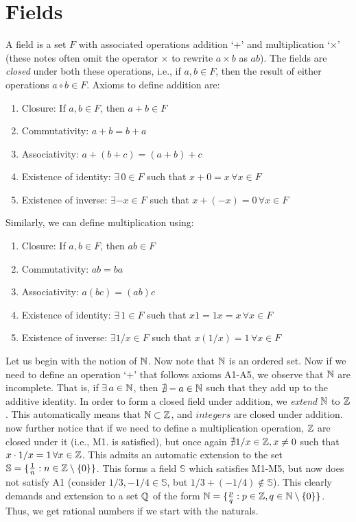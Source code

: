 \section{Fields}
A field is a set $F$ with associated operations addition `$+$' and multiplication `$\times$' (these notes often omit the operator $\times$ to rewrite $a\times b$ as $ab$). The fields are \textit{closed} under both these operations, i.e., if $a,b\in F$, then the result of either operations $a\circ b \in F$. Axioms to define addition are:
\begin{enumerate}[label=A\arabic*.]
\item Closure: If $a,b\in F$, then $a+b\in F$
\item Commutativity: $a+b=b+a$
\item Associativity: $a+(b+c) = (a+b)+c$
\item Existence of identity: $\exists \,0\in F$ such that $x+0=x\,\forall x\in F$
\item Existence of inverse: $\exists -x\in F$ such that $x+(-x)=0\,\forall x\in F$
\end{enumerate}
Similarly, we can define multiplication using:
\begin{enumerate}[label=M\arabic*.]
\item Closure: If $a,b\in F$, then $ab\in F$
\item Commutativity: $ab=ba$
\item Associativity: $a(bc) = (ab)c$
\item Existence of identity: $\exists \,1\in F$ such that $x1=1x=x\,\forall x\in F$
\item Existence of inverse: $\exists 1/x\in F$ such that $x(1/x)=1\,\forall x\in F$
\end{enumerate}

\begin{remark}
Let us begin with the notion of $\mathbb{N}$. Now note that $\mathbb{N}$ is an ordered set. Now if we need to define an operation `$+$' that follows axioms A1-A5, we observe that $\mathbb{N}$ are incomplete. That is, if $\exists \,a\in\mathbb{N}$, then $\nexists -a\in \mathbb{N}$ such that they add up to the additive identity. In order to form a closed field under addition, we \textit{extend} $\mathbb{N}$ to $\mathbb{Z}$. This automatically means that $\mathbb{N} \subset \mathbb{Z}$, and $integers$ are closed under addition. now further notice that if we need to define a multiplication operation, $\mathbb{Z}$ are closed under it (i.e., M1. is satisfied), but once again $\nexists 1/x \in \mathbb{Z}, x\neq 0$ such that $x\cdot 1/x=1\,\forall x\in \mathbb{Z}$. This admits an automatic extension to the set $\mathbb{S}=\{\frac{1}{n}:n\in \mathbb{Z} \setminus \{0\} \}$. This forms a field $\mathbb{S}$ which satisfies M1-M5, but now does not satisfy A1 (consider $1/3, -1/4 \in\mathbb{S}$, but $1/3 + (-1/4)\notin \mathbb{S}$). This clearly demands and extension to a set $\mathbb{Q}$ of the form $\mathbb{N}=\{\frac{p}{q}:p\in\mathbb{Z},q\in \mathbb{N} \setminus \{0\}\}$. Thus, we get rational numbers if we start with the naturals.
\end{remark}

